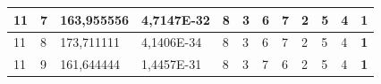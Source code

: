 \documentclass[conference]{IEEEtran}
\begin{document}
\begin{table}[]
\begin{tabular}{|llll|llllllll|}
\multicolumn{1}{|l|}{11}                                                    & \multicolumn{1}{l|}{7}                                                        & \multicolumn{1}{l|}{163,955556}                                                   & 4,7147E-32                     & \multicolumn{1}{l|}{8}                                                  & \multicolumn{1}{l|}{3}                                                  & \multicolumn{1}{l|}{6}                                                  & \multicolumn{1}{l|}{7}                                                  & \multicolumn{1}{l|}{2}                                                  & \multicolumn{1}{l|}{5}                                                  & \multicolumn{1}{l|}{4}                                                  & \textbf{1}                 \\ \hline
\multicolumn{1}{|l|}{11}                                                    & \multicolumn{1}{l|}{8}                                                        & \multicolumn{1}{l|}{173,711111}                                                   & 4,1406E-34                     & \multicolumn{1}{l|}{8}                                                  & \multicolumn{1}{l|}{3}                                                  & \multicolumn{1}{l|}{6}                                                  & \multicolumn{1}{l|}{7}                                                  & \multicolumn{1}{l|}{2}                                                  & \multicolumn{1}{l|}{5}                                                  & \multicolumn{1}{l|}{4}                                                  & \textbf{1}                 \\ \hline
\multicolumn{1}{|l|}{11}                                                    & \multicolumn{1}{l|}{9}                                                        & \multicolumn{1}{l|}{161,644444}                                                   & 1,4457E-31                     & \multicolumn{1}{l|}{8}                                                  & \multicolumn{1}{l|}{3}                                                  & \multicolumn{1}{l|}{7}                                                  & \multicolumn{1}{l|}{6}                                                  & \multicolumn{1}{l|}{2}                                                  & \multicolumn{1}{l|}{5}                                                  & \multicolumn{1}{l|}{4}                                                  & \textbf{1}                 \\ \hline

\end{tabular}
\end{table}
\end{document}
